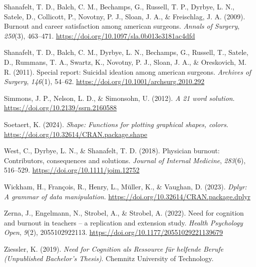 \documentclass[
  english,
  man]{apa6}
\newlength{\cslhangindent}
\newenvironment{CSLReferences}[2] %
 {\begin{list}{}{%
  \setlength{\itemindent}{0pt}
  \setlength{\leftmargin}{0pt}
  \setlength{\parsep}{0pt}
  \ifodd #1
   \setlength{\leftmargin}{\cslhangindent}
   \setlength{\itemindent}{-1\cslhangindent}
  \fi
  \setlength{\itemsep}{#2\baselineskip}}}
 {\end{list}}
\begin{document}
\begin{CSLReferences}{1}{0}
Shanafelt, T. D., Balch, C. M., Bechamps, G., Russell, T. P., Dyrbye, L. N., Satele, D., Collicott, P., Novotny, P. J., Sloan, J. A., \& Freischlag, J. A. (2009). Burnout and career satisfaction among american surgeons. \emph{Annals of Surgery}, \emph{250}(3), 463--471. \url{https://doi.org/10.1097/sla.0b013e3181ac4dfd}

Shanafelt, T. D., Balch, C. M., Dyrbye, L. N., Bechamps, G., Russell, T., Satele, D., Rummans, T. A., Swartz, K., Novotny, P. J., Sloan, J. A., \& Oreskovich, M. R. (2011). Special report: Suicidal ideation among american surgeons. \emph{Archives of Surgery}, \emph{146}(1), 54--62. \url{https://doi.org/10.1001/archsurg.2010.292}

Simmons, J. P., Nelson, L. D., \& Simonsohn, U. (2012). \emph{A 21 word solution}. \url{https://doi.org/10.2139/ssrn.2160588}

Soetaert, K. (2024). \emph{Shape: Functions for plotting graphical shapes, colors}. \url{https://doi.org/10.32614/CRAN.package.shape}

West, C., Dyrbye, L. N., \& Shanafelt, T. D. (2018). Physician burnout: Contributors, consequences and solutions. \emph{Journal of Internal Medicine}, \emph{283}(6), 516--529. \url{https://doi.org/10.1111/joim.12752}

Wickham, H., François, R., Henry, L., Müller, K., \& Vaughan, D. (2023). \emph{Dplyr: A grammar of data manipulation}. \url{https://doi.org/10.32614/CRAN.package.dplyr}

Zerna, J., Engelmann, N., Strobel, A., \& Strobel, A. (2022). Need for cognition and burnout in teachers -- a replication and extension study. \emph{Health Psychology Open}, \emph{9}(2), 2055102922113. \url{https://doi.org/10.1177/20551029221139679}

Ziessler, K. (2019). \emph{{Need for Cognition als Ressource für helfende Berufe} ({Unpublished Bachelor's Thesis})}. Chemnitz University of Technology.

\end{CSLReferences}
\end{document}
